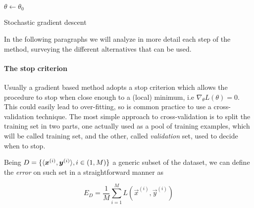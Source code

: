 \begin{algorithm}[]
  
 \BlankLine
 
 $\theta \gets \theta_0$\\
\caption{Stochastic gradient descent}
\label{algo:sgd}
\end{algorithm}

In the following paragraphs we will analyze in more detail each step of the method, surveying the different alternatives 
that can be used.

\paragraph{The stop criterion}

Usually a gradient based method adopts a stop criterion which allows the procedure to stop when close enough to a (local) 
minimum, i.e $\nabla_\theta L(\theta)=0$.  This could easily lead to over-fitting, so is common practice to use a 
cross-validation technique. The most simple approach to cross-validation is to split the training set in two parts, one actually used as a pool of training examples, which will be called training set, and the other, called \textit{validation} set, used to decide when to stop.

Being $D=\{\langle\boldsymbol{x}^{(i)},\boldsymbol{y}^{(i)}\rangle, i\in(1,M)\}$ a generic subset of the dataset, we can define the \textit{error} on such set in a straightforward manner as 

\begin{equation}
 E_D = \frac{1}{M} \sum_{i=1}^M  L(\vec{x}^{(i)},\vec{y}^{(i)})
\end{equation}

